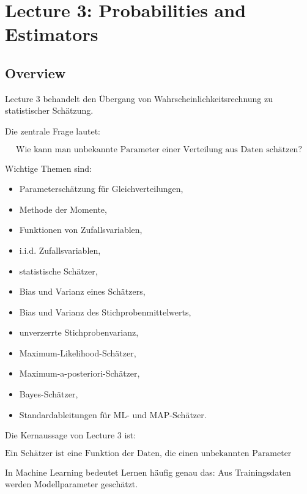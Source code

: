 \documentclass[11pt,a4paper]{scrartcl}
\begin{document}
\section{Lecture 3: Probabilities and Estimators}

\subsection{Overview}

\begin{notebox}
    Lecture 3 behandelt den Übergang von Wahrscheinlichkeitsrechnung zu
    statistischer Schätzung.

    Die zentrale Frage lautet:

    \[
        \text{Wie kann man unbekannte Parameter einer Verteilung aus Daten schätzen?}
    \]

    Wichtige Themen sind:

    \begin{itemize}
        \item Parameterschätzung für Gleichverteilungen,
        \item Methode der Momente,
        \item Funktionen von Zufallsvariablen,
        \item i.i.d. Zufallsvariablen,
        \item statistische Schätzer,
        \item Bias und Varianz eines Schätzers,
        \item Bias und Varianz des Stichprobenmittelwerts,
        \item unverzerrte Stichprobenvarianz,
        \item Maximum-Likelihood-Schätzer,
        \item Maximum-a-posteriori-Schätzer,
        \item Bayes-Schätzer,
        \item Standardableitungen für ML- und MAP-Schätzer.
    \end{itemize}
\end{notebox}

\begin{answerbox}
    Die Kernaussage von Lecture 3 ist:

    \[
        \boxed{
            \text{Ein Schätzer ist eine Funktion der Daten, die einen unbekannten Parameter approximiert.}
        }
    \]

    In Machine Learning bedeutet Lernen häufig genau das:
    Aus Trainingsdaten werden Modellparameter geschätzt.
\end{answerbox}
\end{document}
